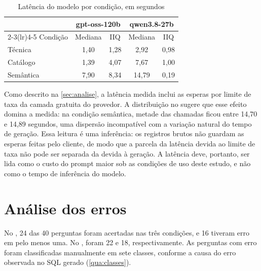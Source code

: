 \begin{table}[htb]
  \centering
  \caption{Latência do modelo por condição, em segundos}
  \label{tab:latencia}
  \begin{tabular}{lcccc}
    \toprule
    & \multicolumn{2}{c}{gpt-oss-120b} & \multicolumn{2}{c}{qwen3.8-27b} \\
    \cmidrule(lr){2-3}\cmidrule(lr){4-5}
    Condição & Mediana & IIQ & Mediana & IIQ \\
    \midrule
    Técnica   & 1,40 & 1,28 & 2,92  & 0,98 \\
    Catálogo  & 1,39 & 4,07 & 7,67  & 1,00 \\
    Semântica & 7,90 & 8,34 & 14,79 & 0,19 \\
    \bottomrule
  \end{tabular}
\end{table}

Como descrito na \autoref{sec:analise}, a latência medida inclui as
esperas por limite de taxa da camada gratuita do provedor. A distribuição
no  sugere que esse efeito domina a medida: na condição
semântica, metade das chamadas ficou entre 14,70 e 14,89 segundos, uma
dispersão incompatível com a variação natural do tempo de geração. Essa
leitura é uma inferência: os registros brutos não guardam as esperas
feitas pelo cliente, de modo que a parcela da latência devida ao limite
de taxa não pode ser separada da devida à geração. A latência deve, portanto, ser lida como o custo do prompt maior sob as
condições de uso deste estudo, e não como o tempo de inferência do modelo.

\section{Análise dos erros}
\label{sec:taxonomia}

No , 24 das 40 perguntas foram acertadas nas três
condições, e 16 tiveram erro em pelo menos uma. No , foram
22 e 18, respectivamente. As perguntas com erro foram classificadas
manualmente em sete classes, conforme a causa do erro observada no SQL
gerado (\autoref{qua:classes}).


